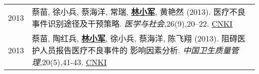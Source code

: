 \documentclass{resume}
\begin{document}
\begin{longtable}{r p{14cm}}
2013 & 蔡苗, 徐小兵, 蔡海洋, 常瑞, \underline{\textbf{林小军}}, 黄艳然 (2013). 医疗不良事件识别途径及干预策略. \emph{医学与社会},26(9),20–22. \href{http://kns.cnki.net/KCMS/detail/detail.aspx?dbcode=CJFQ&dbname=CJFDHIS2&filename=YXSH201309007&v=MDAwNDFyQ1VSTEtlWnVac0Zpdm1XcnZOUERYWVpyRzRIOUxNcG85Rlk0UjhlWDFMdXhZUzdEaDFUM3FUcldNMUY=}{CNKI}\\[5pt]

2013 & 蔡苗, 陶红兵, \underline{\textbf{林小军}}, 徐小兵, 蔡海洋, 陈飞翔 (2013). 阻碍医护人员报告医疗不良事件的 影响因素分析. \emph{中国卫生质量管理},20(5),41-43. \href{http://kns.cnki.net/KCMS/detail/detail.aspx?dbcode=CJFQ&dbname=CJFDHIS2&filename=WSJG201305024&v=Mjc4MDIxTHV4WVM3RGgxVDNxVHJXTTFGckNVUkxLZVp1WnNGaXZuVXJ6Tk1qN0JhYkc0SDlMTXFvOUhZSVI4ZVg=}{CNKI}\\	
\end{longtable}

\end{document}
